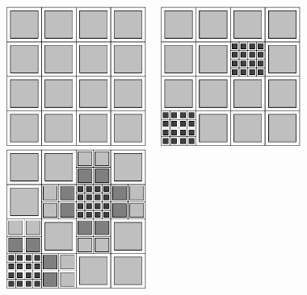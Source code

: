 \centerline{\includegraphics[width=1.8in]{amr4-1.eps} \ \
            \includegraphics[width=1.8in]{amr4-2.eps} \ \
            \includegraphics[width=1.8in]{amr4-3.eps}}

